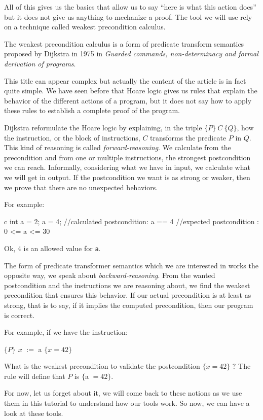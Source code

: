 All of this gives us the basics that allow us to say ``here is what
this action does'' but it does not give us anything to mechanize a
proof. The tool we will use rely on a technique called weakest
precondition calculus.





The weakest precondition calculus is a form of predicate transform
semantics proposed by Dijkstra in 1975 in \emph{Guarded commands,
non-determinacy and formal derivation of programs}.

This title can appear complex but actually the content of the article is in
fact quite simple. We have seen before that Hoare logic gives us rules that
explain the behavior of the different actions of a program, but it does not say
how to apply these rules to establish a complete proof of the program.

Dijkstra reformulate the Hoare logic by explaining, in the triple
$\{P\}\ C\ \{Q\}$, how the instruction, or the block of instructions,
$C$ transforms the predicate $P$ in $Q$. This kind of reasoning is
called \emph{forward-reasoning}. We calculate from the precondition and
from one or multiple instructions, the strongest postcondition we can
reach. Informally, considering what we have in input, we calculate what
we will get in output. If the postcondition we want is as strong or
weaker, then we prove that there are no unexpected behaviors.



For example:



\begin{CodeBlock}{c}
int a = 2;
a = 4;
//calculated postcondition: a == 4
//expected postcondition  : 0 <= a <= 30
\end{CodeBlock}



Ok, 4 is an allowed value for \texttt{a}.



The form of predicate transformer semantics which we are interested in
works the opposite way, we speak about \emph{backward-reasoning}. From
the wanted postcondition and the instructions we are reasoning about, we
find the weakest precondition that ensures this behavior. If our actual
precondition is at least as strong, that is to say, if it implies the
computed precondition, then our program is correct.



For example, if we have the instruction:



$\{P\}$ $x$ $:=$ a $\{x = 42\}$



What is the weakest precondition to validate the postcondition
$\{x = 42\}$ ? The rule will define that $P$ is $\{$a $=42\}$.



For now, let us forget about it, we will come back to these notions as
we use them in this tutorial to understand how our tools work. So now,
we can have a look at these tools.
